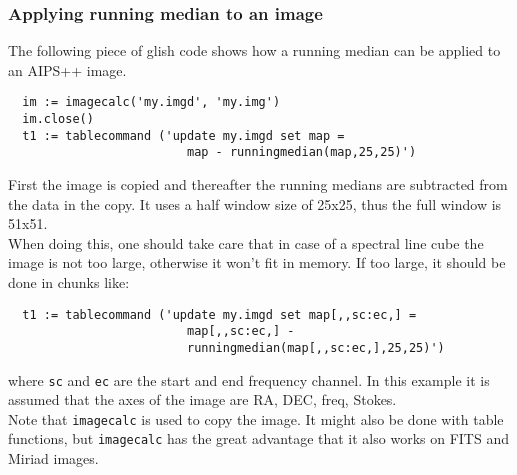 \subsubsection{\label{TAQL:RUNEXAMPLES}Applying running median to an image}
The following piece of glish code shows how a running median can 
be applied to an AIPS++ image.
\begin{verbatim}
  im := imagecalc('my.imgd', 'my.img')
  im.close()
  t1 := tablecommand ('update my.imgd set map =
                         map - runningmedian(map,25,25)')
\end{verbatim}
First the image is copied and thereafter the running medians are
subtracted from the data in the copy. It uses a half window size 
of 25x25, thus the full window is 51x51.
\\When doing this, one should take care that in case of a spectral
line cube the image is not too large, otherwise it won't fit in
memory. If too large, it should be done in chunks like:
\begin{verbatim}
  t1 := tablecommand ('update my.imgd set map[,,sc:ec,] =
                         map[,,sc:ec,] -
                         runningmedian(map[,,sc:ec,],25,25)')
\end{verbatim}
where \texttt{sc} and \texttt{ec} are the start and end frequency
channel.
In this example it is assumed that the axes of the image are RA, DEC,
freq, Stokes.
\\Note that \texttt{imagecalc} is used to copy the image. It might
also be done with table functions, but \texttt{imagecalc} has the
great advantage that it also works on FITS and Miriad images.

